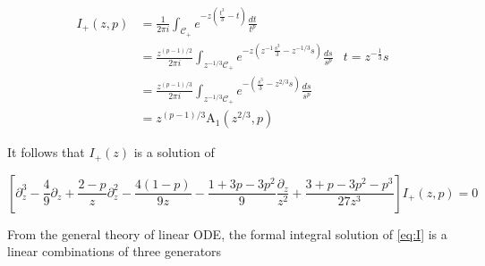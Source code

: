 \documentclass{article}
\begin{document}
\begin{align*}
I_{+}(z,p)&=\frac{1}{2\pi i}\int_{\mathcal{C}_{+}}e^{-z(\tfrac{t^3}{3}-t)}\frac{dt}{t^p} &\\
&=\frac{z^{(p-1)/2}}{2\pi i}\int_{z^{-1/3}\mathcal{C}_{+}}e^{-z(z^{-1}\tfrac{s^3}{3}-z^{-1/3}s)}\frac{ds}{s^p} & t=z^{-\tfrac{1}{3}}s\\
&=\frac{z^{(p-1)/3}}{2\pi i}\int_{z^{-1/3}\mathcal{C}_{+}}e^{-\left(\tfrac{s^3}{3}-z^{2/3}s\right)}\frac{ds}{s^p} & \\
&=z^{(p-1)/3}\mathrm{A}_1(z^{2/3},p)
\end{align*}

It follows that $I_+(z)$ is a solution of
 
\begin{equation}\label{eq:I}
\left[\partial_z^3-\frac{4}{9}\partial_z+\frac{2-p}{z}\partial_z^2-\frac{4(1-p)}{9z}-\frac{1+3p-3p^2}{9}\frac{\partial_z}{z^2}+\frac{3+p-3p^2-p^3}{27z^3}\right]I_+(z,p)=0
\end{equation}

From the general theory of linear ODE, the formal integral solution of \eqref{eq:I} is a linear combinations of three generators 
\end{document}
